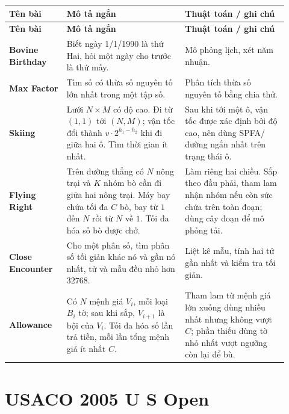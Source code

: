 \documentclass[11pt]{article}
\newenvironment{solutiontable}{%
  \small
  \setlength{\tabcolsep}{4pt}
  \renewcommand{\arraystretch}{1.14}
  \begin{longtable}{L{0.19\linewidth}L{0.39\linewidth}L{0.34\linewidth}}
  \toprule
  \textbf{Tên bài} & \textbf{Mô tả ngắn} & \textbf{Thuật toán / ghi chú}\\
  \midrule
  \endfirsthead
  \toprule
  \textbf{Tên bài} & \textbf{Mô tả ngắn} & \textbf{Thuật toán / ghi chú}\\
  \midrule
  \endhead
}{%
  \bottomrule
  \end{longtable}
  \normalsize
}
\newcommand{\problemrow}[3]{\textbf{#1} & #2 & #3\\\midrule}
\begin{document}
\begin{solutiontable}
\problemrow{Bovine Birthday}{Biết ngày 1/1/1990 là thứ Hai, hỏi một ngày cho trước là thứ mấy.}{Mô phỏng lịch, xét năm nhuận.}
\problemrow{Max Factor}{Tìm số có thừa số nguyên tố lớn nhất trong một tập số.}{Phân tích thừa số nguyên tố bằng chia thử.}
\problemrow{Skiing}{Lưới \(N\times M\) có độ cao. Đi từ \((1,1)\) tới \((N,M)\); vận tốc đổi thành \(v\cdot2^{h_1-h_2}\) khi đi giữa hai ô. Tìm thời gian ít nhất.}{Sau khi tới một ô, vận tốc được xác định bởi độ cao, nên dùng SPFA/đường ngắn nhất trên trạng thái ô.}
\problemrow{Flying Right}{Trên đường thẳng có \(N\) nông trại và \(K\) nhóm bò cần đi giữa hai nông trại. Máy bay chứa tối đa \(C\) bò, bay từ \(1\) đến \(N\) rồi từ \(N\) về \(1\). Tối đa hóa số bò được chở.}{Làm riêng hai chiều. Sắp theo đầu phải, tham lam nhận nhóm nếu còn sức chứa trên toàn đoạn; dùng cây đoạn để mô phỏng tải.}
\problemrow{Close Encounter}{Cho một phân số, tìm phân số tối giản khác nó và gần nó nhất, tử và mẫu đều nhỏ hơn \(32768\).}{Liệt kê mẫu, tính hai tử gần nhất và kiểm tra tối giản.}
\problemrow{Allowance}{Có \(N\) mệnh giá \(V_i\), mỗi loại \(B_i\) tờ; sau khi sắp, \(V_{i+1}\) là bội của \(V_i\). Tối đa hóa số lần trả tiền, mỗi lần tổng mệnh giá ít nhất \(C\).}{Tham lam từ mệnh giá lớn xuống dùng nhiều nhất nhưng không vượt \(C\); phần thiếu dùng tờ nhỏ nhất vượt ngưỡng còn lại để bù.}
\end{solutiontable}

\section{USACO 2005 U S Open}
\end{document}
